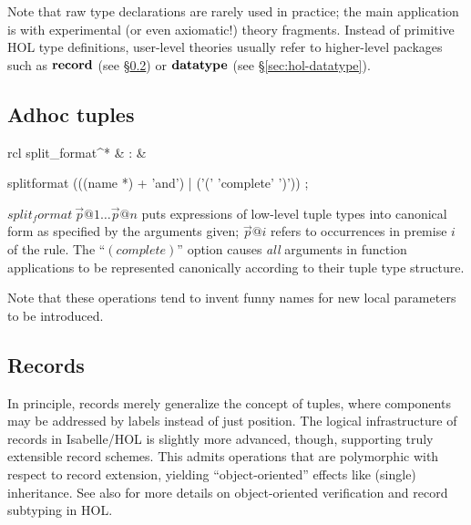 Note that raw type declarations are rarely used in practice; the main
application is with experimental (or even axiomatic!) theory fragments.
Instead of primitive HOL type definitions, user-level theories usually refer
to higher-level packages such as ${\mathord{\mathbf{record}}}$ (see
\S\ref{sec:hol-record}) or ${\mathord{\mathbf{datatype}}}$ (see
\S\ref{sec:hol-datatype}).


\subsection{Adhoc tuples}

\begin{matharray}{rcl}
  split_format^* & : & \isaratt \\
\end{matharray}


\begin{rail}
  splitformat (((name *) + 'and') | ('(' 'complete' ')'))
  ;
\end{rail}

\begin{descr}
  
\item [$split_format~\vec p@1 \dots \vec p@n$] puts expressions of low-level
  tuple types into canonical form as specified by the arguments given; $\vec
  p@i$ refers to occurrences in premise $i$ of the rule.  The ``$(complete)$''
  option causes \emph{all} arguments in function applications to be
  represented canonically according to their tuple type structure.

  Note that these operations tend to invent funny names for new local
  parameters to be introduced.

\end{descr}


\subsection{Records}\label{sec:hol-record}

In principle, records merely generalize the concept of tuples, where
components may be addressed by labels instead of just position.  The logical
infrastructure of records in Isabelle/HOL is slightly more advanced, though,
supporting truly extensible record schemes.  This admits operations that are
polymorphic with respect to record extension, yielding ``object-oriented''
effects like (single) inheritance.  See also \cite{NaraschewskiW-TPHOLs98} for
more details on object-oriented verification and record subtyping in HOL.


